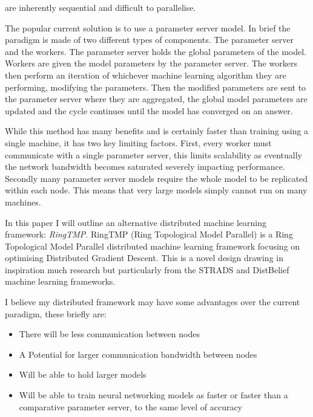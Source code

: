 are inherently sequential and difficult to parallelise.
\par
The popular current solution is to use a parameter server model. In brief the
paradigm is made of two different types of components. The parameter server and
the workers. The parameter server holds the global parameters of the model.
Workers are given the model parameters by the parameter server. The workers then
perform an iteration of whichever machine learning algorithm they are
performing, modifying the parameters. Then the modified parameters are sent to
the parameter server where they are aggregated, the global model parameters are
updated and the cycle continues until the model has converged on an answer.

While this method has many benefits and is certainly faster than training using
a single machine, it has two key limiting factors. First, every worker must
communicate with a single parameter server, this limits scalability as
eventually the network bandwidth becomes saturated severely impacting
performance. \cite{LI2014ParameterServers} Secondly many parameter server models
require the whole model to be replicated within each node.
\cite{jia2018BeyondData} This means that very large models simply cannot run on
many machines.
\par
In this paper I will outline an alternative distributed machine learning
framework: \textit{RingTMP}. RingTMP (Ring Topological Model Parallel) is a Ring
Topological Model Parallel distributed machine learning framework focusing on
optimising Distributed Gradient Descent. This is a novel design drawing in
inspiration much research but particularly from the STRADS and DistBelief
machine learning frameworks. \cite{kim2016STRADS,Dean2012Distbelief}
\par
I believe my distributed framework may have some advantages over the current
paradigm, these briefly are:
\begin{itemize}
    \item There will be less communication between nodes
    \item A Potential for larger communication bandwidth between nodes
    \item Will be able to hold larger models
    \item Will be able to train neural networking models as faster or faster
    than a comparative parameter server, to the same level of accuracy
\end{itemize}

